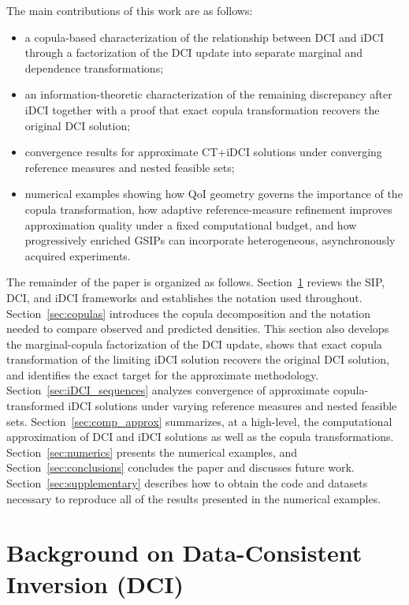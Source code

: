 \documentclass{article}
\newcounter{example}[section]
\begin{document}
The main contributions of this work are as follows:
\begin{itemize}
    \item a copula-based characterization of the relationship between DCI and iDCI through a factorization of the DCI update into separate marginal and dependence transformations;
    \item an information-theoretic characterization of the remaining discrepancy after iDCI together with a proof that exact copula transformation recovers the original DCI solution;
    \item convergence results for approximate CT+iDCI solutions under converging reference measures and nested feasible sets;
    \item numerical examples showing how QoI geometry governs the importance of the copula transformation, how adaptive reference-measure refinement improves approximation quality under a fixed computational budget, and how progressively enriched GSIPs can incorporate heterogeneous, asynchronously acquired experiments.
\end{itemize}

The remainder of the paper is organized as follows. Section~\ref{sec:DCI_background} reviews the SIP, DCI, and iDCI frameworks and establishes the notation used throughout.
Section~\ref{sec:copulas} introduces the copula decomposition and the notation needed to compare observed and predicted densities.
This section also develops the marginal-copula factorization of the DCI update, shows that exact copula transformation of the limiting iDCI solution recovers the original DCI solution, and identifies the exact target for the approximate methodology.
Section~\ref{sec:iDCI_sequences} analyzes convergence of approximate copula-transformed iDCI solutions under varying reference measures and nested feasible sets.
Section~\ref{sec:comp_approx} summarizes, at a high-level, the computational approximation of DCI and iDCI solutions as well as the copula transformations.
Section~\ref{sec:numerics} presents the numerical examples, and Section~\ref{sec:conclusions} concludes the paper and discusses future work.
Section~\ref{sec:supplementary} describes how to obtain the code and datasets necessary to reproduce all of the results presented in the numerical examples.

\section{Background on Data-Consistent Inversion (DCI)}\label{sec:DCI_background}
\end{document}
